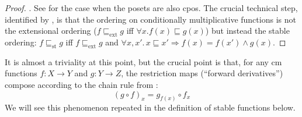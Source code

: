 \begin{proof}
  \AGDA. See \citet[Theorem 12.1.9]{amadio-curien} for the
  case when the posets are also cpos. The crucial technical step,
  identified by \citet{berry79}, is that the ordering on conditionally
  multiplicative functions is not the extensional ordering
  ($f \sqsubseteq_{\mathrm{ext}} g$ iff
  $\forall x. f(x) \sqsubseteq g(x)$) but instead the stable ordering:
  $f \sqsubseteq_{\mathrm{st}} g$ iff $f \sqsubseteq_{\mathrm{ext}} g$ and
  $\forall x, x'.\,x \sqsubseteq x' \Rightarrow f(x) = f(x') \land
  g(x)$.
\end{proof}

\begin{remark}
  \label{rem:chain-rule-cm}
  It is almost a triviality at this point, but the crucial point is
  that, for any cm functions $f : X \to Y$ and $g : Y \to Z$, the
  restriction maps (``forward derivatives'') compose according to the
  chain rule from :
  \begin{displaymath}
    (g \circ f)_x = g_{f(x)} \circ f_x
  \end{displaymath}
  We will see this phenomenon repeated in the definition of stable
  functions below.
\end{remark}

